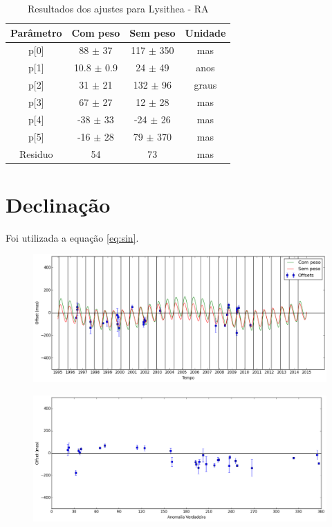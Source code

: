 \documentclass[11pt,a4paper]{report}
\begin{document}
\begin{table}[h!]
\caption{\label{Tab: Lysithea-RA} Resultados dos ajustes para Lysithea - RA}
\begin{centering}
\begin{tabular}{cccc}
\hline
\hline
Parâmetro & Com peso & Sem peso & Unidade\tabularnewline
\hline
p[0] & 88 $\pm$ 37 & 117 $\pm$ 350 & mas\\
p[1] & 10.8 $\pm$ 0.9 & 24 $\pm$ 49 & anos\\
p[2] & 31 $\pm$ 21 & 132 $\pm$ 96 & graus\\
p[3] & 67 $\pm$ 27 & 12 $\pm$ 28 & mas\\
p[4] & -38 $\pm$ 33 & -24 $\pm$ 26 & mas\\
p[5] & -16 $\pm$ 28 & 79 $\pm$ 370 & mas\\
Residuo & 54 & 73 & mas\\
\hline 
\end{tabular} 
\par\end{centering}
\end{table}

\section*{Declinação}

Foi utilizada a equação \ref{eq:sin}.

\begin{figure}[h]
\includegraphics[scale=0.45]{Lysithea/DEC.png} 
\end{figure}

\begin{figure}[h]
\includegraphics[scale=0.45]{Lysithea/DEC_anom.png}  
\end{figure}
\end{document}
